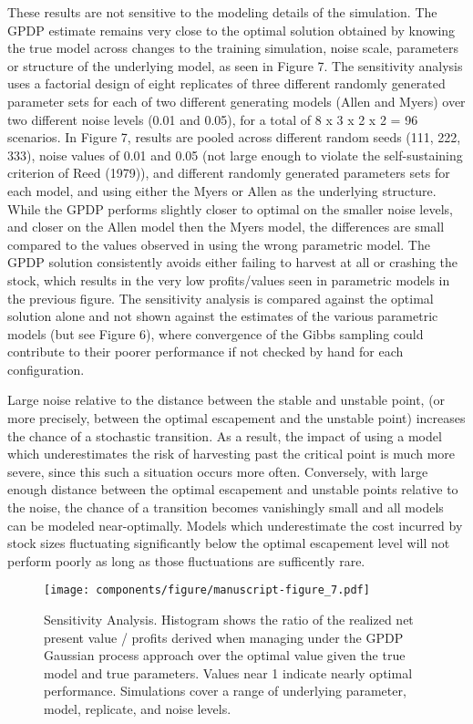 \documentclass[author-year, 12pt,review]{elsarticle} %
\makeatletter
\def\maxwidth{\ifdim\Gin@nat@width>\linewidth\linewidth
\else\Gin@nat@width\fi}
\let\Oldincludegraphics\includegraphics
\renewcommand{\includegraphics}[1]{\Oldincludegraphics[width=\maxwidth]{#1}}
\makeatother
\begin{document}
These results are not sensitive to the modeling details of the
simulation. The GPDP estimate remains very close to the optimal solution
obtained by knowing the true model across changes to the training
simulation, noise scale, parameters or structure of the underlying
model, as seen in Figure 7. The sensitivity analysis uses a factorial
design of eight replicates of three different randomly generated
parameter sets for each of two different generating models (Allen and
Myers) over two different noise levels (0.01 and 0.05), for a total of 8
x 3 x 2 x 2 = 96 scenarios. In Figure 7, results are pooled across
different random seeds (111, 222, 333), noise values of 0.01 and 0.05
(not large enough to violate the self-sustaining criterion of Reed
(1979)), and different randomly generated parameters sets for each
model, and using either the Myers or Allen as the underlying structure.
While the GPDP performs slightly closer to optimal on the smaller noise
levels, and closer on the Allen model then the Myers model, the
differences are small compared to the values observed in using the wrong
parametric model. The GPDP solution consistently avoids either failing
to harvest at all or crashing the stock, which results in the very low
profits/values seen in parametric models in the previous figure. The
sensitivity analysis is compared against the optimal solution alone and
not shown against the estimates of the various parametric models (but
see Figure 6), where convergence of the Gibbs sampling could contribute
to their poorer performance if not checked by hand for each
configuration.

Large noise relative to the distance between the stable and unstable
point, (or more precisely, between the optimal escapement and the
unstable point) increases the chance of a stochastic transition. As a
result, the impact of using a model which underestimates the risk of
harvesting past the critical point is much more severe, since this such
a situation occurs more often. Conversely, with large enough distance
between the optimal escapement and unstable points relative to the
noise, the chance of a transition becomes vanishingly small and all
models can be modeled near-optimally. Models which underestimate the
cost incurred by stock sizes fluctuating significantly below the optimal
escapement level will not perform poorly as long as those fluctuations
are sufficently rare.

\begin{figure}[htbp]
\centering
\texttt{[image: components/figure/manuscript-figure\_7.pdf]}
\caption{Sensitivity Analysis. Histogram shows the ratio of the realized
net present value / profits derived when managing under the GPDP
Gaussian process approach over the optimal value given the true model
and true parameters. Values near 1 indicate nearly optimal performance.
Simulations cover a range of underlying parameter, model, replicate, and
noise levels.}
\end{figure}
\end{document}
